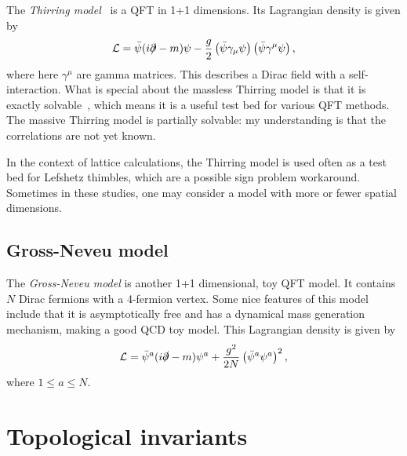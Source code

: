 The {\it Thirring model}~\cite{thirring_soluble_1958} is a QFT in 1+1 dimensions.
Its Lagrangian density is given by
\begin{equation}
  \mathcal{L}=\bar{\psi}(i\partial\!\!\!/-m)\psi -\frac{g}{2}
         \left(\bar{\psi}\gamma_\mu\psi\right) \left(\bar{\psi}\gamma^\mu
\psi\right),
\end{equation}
where here $\gamma^\mu$ are  gamma matrices.
This describes a Dirac field with a self-interaction.
What is special about the massless Thirring model is that it is 
exactly solvable~\cite{johnson_solution_1961,hagen_new_1967,klaiber_1968}, 
which means it is a useful test bed for various QFT methods.
The massive Thirring model is partially solvable: my understanding is that the
correlations are not yet known.

In the context of lattice calculations, the Thirring model is used often as a
test bed for Lefshetz thimbles, which are a possible sign problem workaround.
Sometimes in these studies, one may consider a model with more or fewer spatial
dimensions.

\subsection{Gross-Neveu model}\label{sec:GNmodel}

The {\it Gross-Neveu model} \cite{gross_dynamical_1974} is another
1+1 dimensional, toy QFT model. It contains $N$ Dirac fermions with a
4-fermion vertex. Some nice features of this model include that it is
asymptotically free and has a dynamical mass generation mechanism, making
a good QCD toy model. This Lagrangian density is given by
\begin{equation}
\mathcal{L}=\bar{\psi}^a(i \slashed\partial-m) \psi^a+\frac{g^2}{2
N}\left(\bar{\psi}^a \psi^a\right)^2,
\end{equation}
where $1\leq a\leq N$.

\section{Topological invariants}\label{sec:topinvar}

